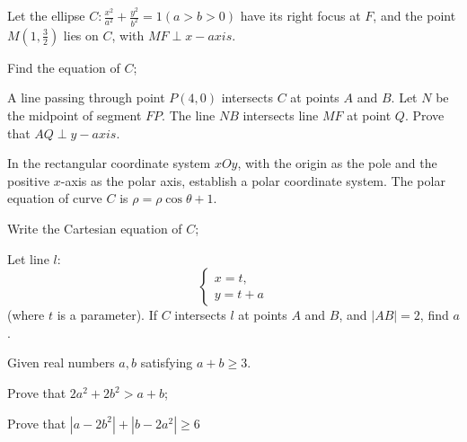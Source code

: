 \documentclass[UTF8,12pt]{ctexart}
\begin{document}
\begin{questions}[start=17]
  \item Let the ellipse $C: \frac{x^{2}}{a^{2}}+\frac{y^{2}}{b^{2}}=1 (a > b > 0)$ have
    its right focus at $F$, and the point $M \left(1,\frac{3}{2}\right)$ lies on $C$,
    with $MF \perp x-axis$.

    \begin{subquestions}
      \item
      Find the equation of $C$;
      \item
      A line passing through point $P(4,0)$ intersects $C$ at points $A$ and $B$. Let
        $N$ be the midpoint of segment $FP$. The line $NB$ intersects line $MF$ at point
        $Q$. Prove that $AQ \perp y-axis$.
    \end{subquestions}

  \item In the rectangular coordinate system $xOy$, with the origin as the pole and the
    positive $x$-axis as the polar axis, establish a polar coordinate system. The polar
    equation of curve $C$ is $\rho = \rho \cos \theta + 1$.

    \begin{subquestions}
      \item
      Write the Cartesian equation of $C$;
      \item
      Let line $l:$ \[\begin{cases}x=t, \\ y=t+a\end{cases}\] (where $t$ is a
        parameter). If $C$ intersects $l$ at points $A$ and $B$, and $|AB|=2$, find $a$.
    \end{subquestions}

  \item Given real numbers $a, b$ satisfying $a + b \geqslant 3$.

    \begin{subquestions}
      \item
      Prove that $2a^{2}+2b^{2}>a+b$;
      \item
      Prove that $\left|a-2b^{2}\right|+\left|b-2a^{2}\right|\geqslant6$
    \end{subquestions}

\end{questions}
\end{document}

